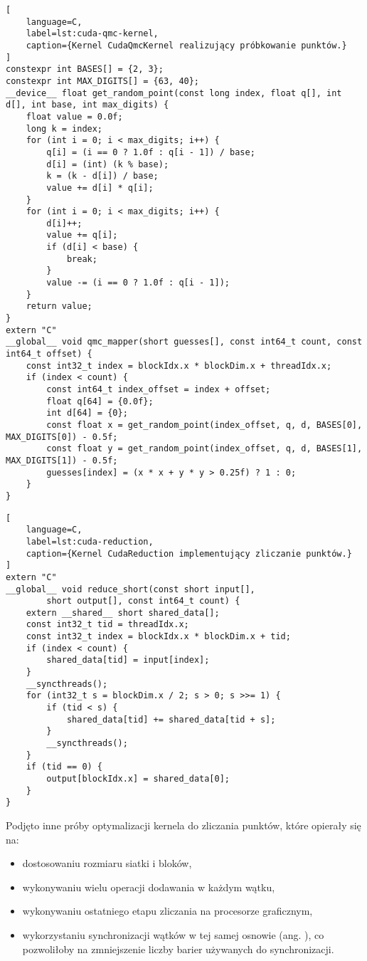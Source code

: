 \begin{lstlisting}[
    language=C,
    label=lst:cuda-qmc-kernel,
    caption={Kernel CudaQmcKernel realizujący próbkowanie punktów.}
]
constexpr int BASES[] = {2, 3};
constexpr int MAX_DIGITS[] = {63, 40};
__device__ float get_random_point(const long index, float q[], int d[], int base, int max_digits) {
    float value = 0.0f;
    long k = index;
    for (int i = 0; i < max_digits; i++) {
        q[i] = (i == 0 ? 1.0f : q[i - 1]) / base;
        d[i] = (int) (k % base);
        k = (k - d[i]) / base;
        value += d[i] * q[i];
    }
    for (int i = 0; i < max_digits; i++) {
        d[i]++;
        value += q[i];
        if (d[i] < base) {
            break;
        }
        value -= (i == 0 ? 1.0f : q[i - 1]);
    }
    return value;
}
extern "C"
__global__ void qmc_mapper(short guesses[], const int64_t count, const int64_t offset) {
    const int32_t index = blockIdx.x * blockDim.x + threadIdx.x;
    if (index < count) {
        const int64_t index_offset = index + offset;
        float q[64] = {0.0f};
        int d[64] = {0};
        const float x = get_random_point(index_offset, q, d, BASES[0], MAX_DIGITS[0]) - 0.5f;
        const float y = get_random_point(index_offset, q, d, BASES[1], MAX_DIGITS[1]) - 0.5f;
        guesses[index] = (x * x + y * y > 0.25f) ? 1 : 0;
    }
}
\end{lstlisting}

\begin{lstlisting}[
    language=C,
    label=lst:cuda-reduction,
    caption={Kernel CudaReduction implementujący zliczanie punktów.}
]
extern "C"
__global__ void reduce_short(const short input[],
        short output[], const int64_t count) {
    extern __shared__ short shared_data[];
    const int32_t tid = threadIdx.x;
    const int32_t index = blockIdx.x * blockDim.x + tid;
    if (index < count) {
        shared_data[tid] = input[index];
    }
    __syncthreads();
    for (int32_t s = blockDim.x / 2; s > 0; s >>= 1) {
        if (tid < s) {
            shared_data[tid] += shared_data[tid + s];
        }
        __syncthreads();
    }
    if (tid == 0) {
        output[blockIdx.x] = shared_data[0];
    }
}
\end{lstlisting}

Podjęto inne próby optymalizacji kernela do zliczania punktów, które opierały się na:
\begin{itemize}
    \item dostosowaniu rozmiaru siatki i bloków,
    \item wykonywaniu wielu operacji dodawania w każdym wątku,
    \item wykonywaniu ostatniego etapu zliczania na procesorze graficznym,
    \item wykorzystaniu synchronizacji wątków w tej samej osnowie (ang. ), co pozwoliłoby
          na zmniejszenie liczby barier używanych do synchronizacji.
\end{itemize}

